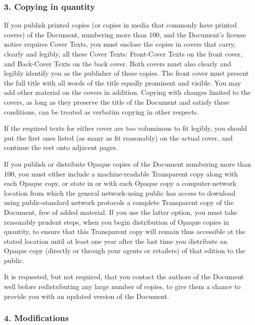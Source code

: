 \documentclass[a4paper,openany,10pt]{book}
\begin{document}
\subsubsection*{3. Copying in quantity}

If you publish printed copies (or copies in media that commonly have
printed covers) of the Document, numbering more than 100, and the
Document's license notice requires Cover Texts, you must enclose the
copies in covers that carry, clearly and legibly, all these Cover
Texts: Front-Cover Texts on the front cover, and Back-Cover Texts on
the back cover.  Both covers must also clearly and legibly identify
you as the publisher of these copies.  The front cover must present
the full title with all words of the title equally prominent and
visible.  You may add other material on the covers in addition.
Copying with changes limited to the covers, as long as they preserve
the title of the Document and satisfy these conditions, can be treated
as verbatim copying in other respects.

If the required texts for either cover are too voluminous to fit
legibly, you should put the first ones listed (as many as fit
reasonably) on the actual cover, and continue the rest onto adjacent
pages.

If you publish or distribute Opaque copies of the Document numbering
more than 100, you must either include a machine-readable Transparent
copy along with each Opaque copy, or state in or with each Opaque copy
a computer-network location from which the general network-using
public has access to download using public-standard network protocols
a complete Transparent copy of the Document, free of added material.
If you use the latter option, you must take reasonably prudent steps,
when you begin distribution of Opaque copies in quantity, to ensure
that this Transparent copy will remain thus accessible at the stated
location until at least one year after the last time you distribute an
Opaque copy (directly or through your agents or retailers) of that
edition to the public.

It is requested, but not required, that you contact the authors of the
Document well before redistributing any large number of copies, to give
them a chance to provide you with an updated version of the Document.

\subsubsection*{4. Modifications}
\end{document}
